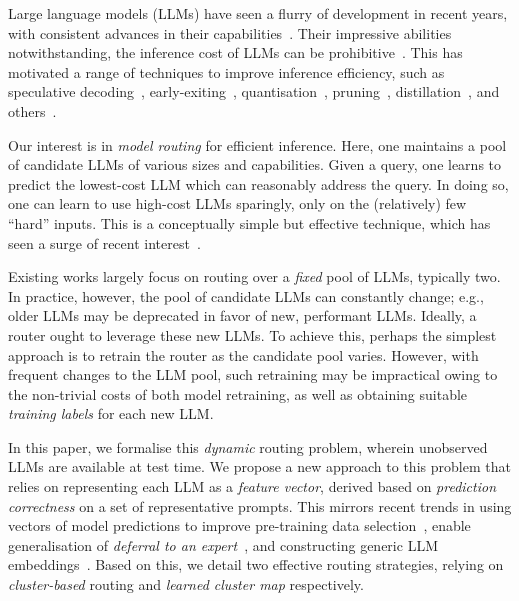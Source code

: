 Large language models (LLMs) have seen a flurry of development in recent years, 
with consistent advances in their capabilities~\citep{Radford:2018,Radford:2019,Brown:2020,Touvron:2023,Anil:2023,Grattafiori:2024,DeepSeekAI:2024}.
Their impressive abilities notwithstanding,
the inference cost of LLMs can be prohibitive~\citep{Li:2024e,Wan:2024,Zhou:2024b}.
This has motivated a range of techniques to improve inference efficiency,
such as 
speculative decoding~\citep{Stern:2018,chen2023accelerating,leviathan2023fast}, 
early-exiting~\citep{SchFisGup2022}, 
quantisation~\citep{Chee:2023}, 
pruning~\citep{Frantar:2023},
distillation~\citep{Agarwal:2024,Rawat:2024}, 
and others~\citep{Pope:2023,Aishwarya:2024,Menghani:2022}.

Our interest is in \emph{model routing} for efficient inference.
Here,
one maintains a pool of candidate LLMs of various sizes and capabilities.
Given a query, 
one learns to predict the lowest-cost LLM which can reasonably address the query.
In doing so, one can learn to use high-cost LLMs sparingly, only on the (relatively) few ``hard'' inputs.
This is a conceptually simple but effective technique,
which has seen a surge of recent interest~\citep{Hendy:2023,Narayanan:2023,Ding:2024,Sakota:2024,CheJiaLin2024,HuBieLi2024,Shnitzer:2023,Wang:2023,Stripelis:2024,OngAlmWu2024,ZhuWuWen2024,Feng:2024,LuYuaLin2024,Zhao:2024,Dann:2024,Aggarwal:2024,Lee:2024}.

Existing works largely focus on routing over a \emph{fixed} pool of LLMs, typically two.
In practice, however, the pool of candidate LLMs can constantly change;
e.g., older LLMs may be deprecated in favor of new, performant LLMs.
Ideally, a router ought to leverage these new LLMs.
To achieve this,
perhaps the simplest approach is to retrain the router as the candidate pool varies.
However, 
with frequent changes to the LLM pool,
such retraining may be impractical 
owing to the non-trivial costs
of 
both model retraining,
as well as 
obtaining suitable \emph{training labels} for each new LLM.

In this paper, we 
formalise this \emph{dynamic} routing problem, wherein unobserved LLMs are available at test time.
We propose a new approach to this problem that relies on representing each LLM as a \emph{feature vector}, derived based on 
\emph{prediction correctness} 
on a set of representative prompts.
This mirrors recent trends in using 
vectors of model predictions to improve pre-training data selection~\citep{Thrush:2024},
enable generalisation of \emph{deferral to an expert}~\citep{Tailor:2024},
and constructing generic LLM embeddings~\citep{ZhuWuWen2024}.
Based on this, we detail two effective 
routing
strategies, relying on \emph{cluster-based} routing and \emph{learned cluster map} respectively.

